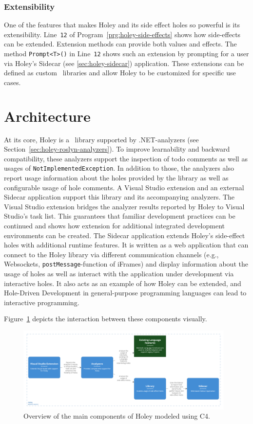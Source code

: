 \subsubsection{Extensibility}
One of the features that makes Holey and its side effect holes so powerful is its extensibility.
Line~\verb|12| of Program~\ref{prg:holey-side-effects} shows how side-effects can be extended.
Extension methods can provide both values and effects.
The method \verb|Prompt<T>()| in Line~\verb|12| shows such an extension by prompting for a user via Holey's Sidecar (see \ref{sec:holey-sidecar}) application.
These extensions can be defined as custom \CS\ libraries and allow Holey to be customized for specific use cases.


\section{Architecture}
\label{sec:holey-architecture}
At its core, Holey is a \CS\ library supported by .NET-analyzers (see Section~\ref{sec:holey-roslyn-analyzers}).
To improve learnability and backward compatibility, these analyzers support the inspection of todo comments as well as usages of \verb|NotImplementedException|.
In addition to those, the analyzers also report usage information about the holes provided by the library as well as configurable usage of hole comments.
A Visual Studio extension and an external Sidecar application support this library and its accompanying analyzers.
The Visual Studio extension bridges the analyzer results reported by Holey to Visual Studio's task list.
This guarantees that familiar development practices can be continued and shows how extension for additional integrated development environments can be created.
The Sidecar application extends Holey's side-effect holes with additional runtime features.
It is written as a web application that can connect to the Holey library via different communication channels (e.g., Websockets, \verb|postMessage|-function of iFrames) and display information about the usage of holes as well as interact with the application under development via interactive holes.
It also acts as an example of how Holey can be extended, and Hole-Driven Development in general-purpose programming languages can lead to interactive programming.

Figure~\ref{fig:holey-architecture} depicts the interaction between these components visually.
\begin{figure}[ht]
    \centering
    \includegraphics[width=0.97\textwidth]{images/holey-architecture}
    \caption{Overview of the main components of Holey modeled using C4.}
    \label{fig:holey-architecture}
\end{figure}

